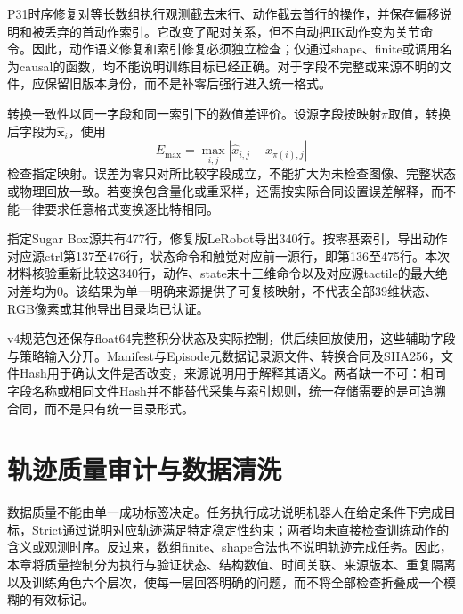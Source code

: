 P31时序修复对等长数组执行观测截去末行、动作截去首行的操作，并保存偏移说明和被丢弃的首动作索引。它改变了配对关系，但不自动把IK动作变为关节命令。因此，动作语义修复和索引修复必须独立检查；仅通过shape、finite或调用名为causal的函数，均不能说明训练目标已经正确。对于字段不完整或来源不明的文件，应保留旧版本身份，而不是补零后强行进入统一格式。

转换一致性以同一字段和同一索引下的数值差评价。设源字段按映射$\pi$取值，转换后字段为$\hat{\boldsymbol x}_i$，使用
\begin{equation}
 E_{\max}=\max_{i,j}\left|\hat{x}_{i,j}-x_{\pi(i),j}\right|
 \label{eq:ch04_mapping_error}
\end{equation}
检查指定映射。误差为零只对所比较字段成立，不能扩大为未检查图像、完整状态或物理回放一致。若变换包含量化或重采样，还需按实际合同设置误差解释，而不能一律要求任意格式变换逐比特相同。

指定Sugar Box源共有477行，修复版LeRobot导出340行。按零基索引，导出动作对应源ctrl第137至476行，状态命令和触觉对应前一源行，即第136至475行。本次材料核验重新比较这340行，动作、state末十三维命令以及对应源tactile的最大绝对差均为0。该结果为单一明确来源提供了可复核映射，不代表全部39维状态、RGB像素或其他导出目录均已认证。

v4规范包还保存float64完整积分状态及实际控制，供后续回放使用，这些辅助字段与策略输入分开。Manifest与Episode元数据记录源文件、转换合同及SHA256，文件Hash用于确认文件是否改变，来源说明用于解释其语义。两者缺一不可：相同字段名称或相同文件Hash并不能替代采集与索引规则，统一存储需要的是可追溯合同，而不是只有统一目录形式。

\section{轨迹质量审计与数据清洗}
\label{sec:data_quality_control}

数据质量不能由单一成功标签决定。任务执行成功说明机器人在给定条件下完成目标，Strict通过说明对应轨迹满足特定稳定性约束；两者均未直接检查训练动作的含义或观测时序。反过来，数组finite、shape合法也不说明轨迹完成任务。因此，本章将质量控制分为执行与验证状态、结构数值、时间关联、来源版本、重复隔离以及训练角色六个层次，使每一层回答明确的问题，而不将全部检查折叠成一个模糊的有效标记。

